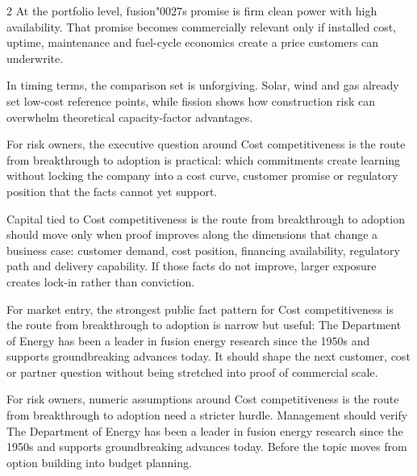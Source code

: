 \documentclass[10pt,a4paper]{article}
\newcommand{\BOApos}{{\BOQuoteFont\char"0027}}
\begin{document}
\begin{multicols}{2}
{\small At the portfolio level, fusion\BOApos{}s promise is firm clean power with high availability. That promise becomes commercially relevant only if installed cost, uptime, maintenance and fuel-cycle economics create a price customers can underwrite.}\par
{\small In timing terms, the comparison set is unforgiving. Solar, wind and gas already set low-cost reference points, while fission shows how construction risk can overwhelm theoretical capacity-factor advantages.}\par
{\small For risk owners, the executive question around Cost competitiveness is the route from breakthrough to adoption is practical: which commitments create learning without locking the company into a cost curve, customer promise or regulatory position that the facts cannot yet support.}\par
{\small Capital tied to Cost competitiveness is the route from breakthrough to adoption should move only when proof improves along the dimensions that change a business case: customer demand, cost position, financing availability, regulatory path and delivery capability. If those facts do not improve, larger exposure creates lock-in rather than conviction.}\par
{\small For market entry, the strongest public fact pattern for Cost competitiveness is the route from breakthrough to adoption is narrow but useful: The Department of Energy has been a leader in fusion energy research since the 1950s and supports groundbreaking advances today. It should shape the next customer, cost or partner question without being stretched into proof of commercial scale.}\par
{\small For risk owners, numeric assumptions around Cost competitiveness is the route from breakthrough to adoption need a stricter hurdle. Management should verify The Department of Energy has been a leader in fusion energy research since the 1950s and supports groundbreaking advances today. Before the topic moves from option building into budget planning.}\par
\end{multicols}
\label{chap:6:end}
\end{document}
